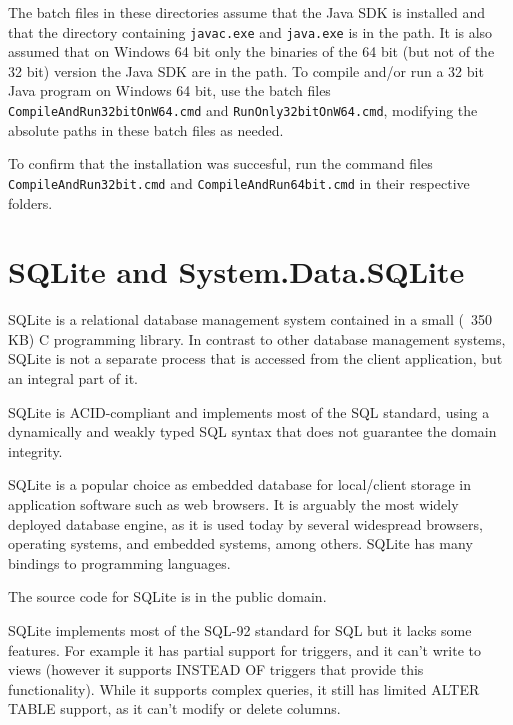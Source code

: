 \vpara
The batch files in these directories assume that the Java SDK is installed and that the directory containing \verb|javac.exe| and \verb|java.exe| is in the path. It is also assumed that on Windows 64 bit only the binaries of the 64 bit (but not of the 32 bit) version the Java SDK are in the path. To compile and/or run a 32 bit Java program on Windows 64 bit, use the batch files \verb|CompileAndRun32bitOnW64.cmd| and \verb|RunOnly32bitOnW64.cmd|, modifying the absolute paths in these batch files as needed.

\vpara
To confirm that the installation was succesful, run the command files \verb|CompileAndRun32bit.cmd| and  \verb|CompileAndRun64bit.cmd| in their respective folders.








\newpage
\section{SQLite and System.Data.SQLite}
SQLite is a relational database management system contained in a small (~350 KB) C programming library. In contrast to other database management systems, SQLite is not a separate process that is accessed from the client application, but an integral part of it.

\vpara
SQLite is ACID-compliant and implements most of the SQL standard, using a dynamically and weakly typed SQL syntax that does not guarantee the domain integrity.

\vpara
SQLite is a popular choice as embedded database for local/client storage in application software such as web browsers. It is arguably the most widely deployed database engine, as it is used today by several widespread browsers, operating systems, and embedded systems, among others. SQLite has many bindings to programming languages.

\vpara
The source code for SQLite is in the public domain.

\vpara
SQLite implements most of the SQL-92 standard for SQL but it lacks some features. For example it has partial support for triggers, and it can't write to views (however it supports INSTEAD OF triggers that provide this functionality). While it supports complex queries, it still has limited ALTER TABLE support, as it can't modify or delete columns.

